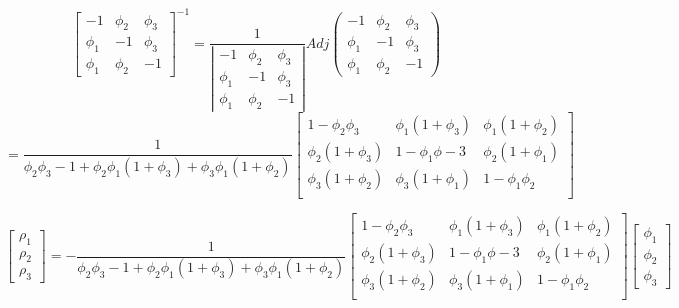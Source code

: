 \documentclass{article}
\begin{document}
\[ \left[\begin{matrix}
    -1 & \phi_2 & \phi_3 \\
    \phi_1 & -1 & \phi_3 \\
    \phi_1 & \phi_2 & -1
\end{matrix}\right]^{-1} = \frac{1}{\left|\begin{matrix}
    -1 & \phi_2 & \phi_3 \\
    \phi_1 & -1 & \phi_3 \\
    \phi_1 & \phi_2 & -1
\end{matrix}\right|}Adj\left(\begin{matrix}
    -1 & \phi_2 & \phi_3 \\
    \phi_1 & -1 & \phi_3 \\
    \phi_1 & \phi_2 & -1
\end{matrix}\right) \]
\[= \frac{1}{\phi_2\phi_3 - 1 + \phi_2\phi_1(1+\phi_3) + \phi_3\phi_1(1+\phi_2)}\left[\begin{matrix}
    1 - \phi_2\phi_3    &   \phi_1(1+\phi_3)    & \phi_1(1+\phi_2)\\
    \phi_2(1+\phi_3)    &   1-\phi_1\phi-3      & \phi_2(1+\phi_1) \\
    \phi_3(1+\phi_2)    &   \phi_3(1+\phi_1)    &   1-\phi_1\phi_2\\
\end{matrix}\right]\]

\[ \left[ \begin{matrix}
    \rho_1 \\ \rho_2 \\ \rho_3
\end{matrix} \right] = - \frac{1}{\phi_2\phi_3 - 1 + \phi_2\phi_1(1+\phi_3) + \phi_3\phi_1(1+\phi_2)}
\left[\begin{matrix}
    1 - \phi_2\phi_3    &   \phi_1(1+\phi_3)    & \phi_1(1+\phi_2)\\
    \phi_2(1+\phi_3)    &   1-\phi_1\phi-3      & \phi_2(1+\phi_1) \\
    \phi_3(1+\phi_2)    &   \phi_3(1+\phi_1)    &   1-\phi_1\phi_2\\
\end{matrix}\right] \left[ \begin{matrix}
    \phi_1 \\ \phi_2 \\ \phi_3
\end{matrix} \right]\]
\end{document}
